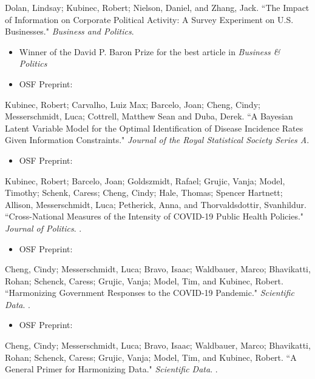 \documentclass[11pt, a4paper]{article}
\newcommand{\years}[1]{\marginnote{\scriptsize #1}}
\begin{document}
\years{2025} Dolan, Lindsay; Kubinec, Robert; Nielson, Daniel, and Zhang, Jack. ``The Impact of Information on Corporate Political Activity: A Survey Experiment on U.S. Businesses." \emph{Business and Politics}. 

\begin{itemize}
	\item Winner of the David P. Baron Prize for the best article in \emph{Business \& Politics}
	\item OSF Preprint: 
\end{itemize}

\years{2025} Kubinec, Robert; Carvalho, Luiz Max; Barcelo, Joan; Cheng, Cindy; Messerschmidt, Luca; Cottrell, Matthew Sean and Duba, Derek. ``A Bayesian Latent Variable Model for the Optimal Identification of Disease Incidence Rates Given Information Constraints." \emph{Journal of the Royal Statistical Society Series A}. 

\begin{itemize}
	\item OSF Preprint: 
\end{itemize}

\years{2024} Kubinec, Robert; Barcelo, Joan; Goldszmidt, Rafael; Grujic, Vanja; Model, Timothy; Schenk, Caress; Cheng, Cindy; Hale, Thomas; Spencer Hartnett; Allison, Messerschmidt, Luca; Petherick, Anna, and Thorvaldsdottir, Svanhildur. ``Cross-National Measures of the Intensity of COVID-19 Public Health Policies." \emph{Journal of Politics}. .

\begin{itemize}
	\item OSF Preprint: 
\end{itemize}

\years{2024} Cheng, Cindy; Messerschmidt, Luca; Bravo, Isaac; Waldbauer, Marco; Bhavikatti, Rohan; Schenck, Caress; Grujic, Vanja; Model, Tim, and Kubinec, Robert. ``Harmonizing Government Responses to the COVID-19 Pandemic." \emph{Scientific Data}. .

\begin{itemize}
	\item OSF Preprint: 
\end{itemize}

\years{2023} Cheng, Cindy; Messerschmidt, Luca; Bravo, Isaac; Waldbauer, Marco; Bhavikatti, Rohan; Schenck, Caress; Grujic, Vanja; Model, Tim, and Kubinec, Robert. ``A General Primer for Harmonizing Data." \emph{Scientific Data}. .
\end{document}
